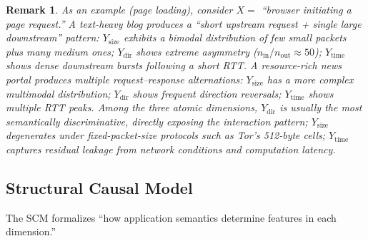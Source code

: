 \documentclass[lettersize,journal]{IEEEtran}
\newtheorem{remark}{Remark}
\begin{document}
\begin{remark}
As an example (page loading), consider $X=$ ``browser initiating a page
request.''
A text-heavy blog produces a ``short upstream request + single large
downstream'' pattern: $Y_{\mathrm{size}}$ exhibits a bimodal distribution
of few small packets plus many medium ones; $Y_{\mathrm{dir}}$ shows
extreme asymmetry ($n_{\mathrm{in}}/n_{\mathrm{out}}\approx 50$);
$Y_{\mathrm{time}}$ shows dense downstream bursts following a short RTT.
A resource-rich news portal produces multiple request--response alternations:
$Y_{\mathrm{size}}$ has a more complex multimodal distribution;
$Y_{\mathrm{dir}}$ shows frequent direction reversals;
$Y_{\mathrm{time}}$ shows multiple RTT peaks.
Among the three atomic dimensions, $Y_{\mathrm{dir}}$ is usually the most
semantically discriminative, directly exposing the interaction pattern;
$Y_{\mathrm{size}}$ degenerates under fixed-packet-size protocols such as
Tor's 512-byte cells; $Y_{\mathrm{time}}$ captures residual leakage from
network conditions and computation latency.
\end{remark}

\subsection{Structural Causal Model}

The SCM formalizes ``how application semantics determine features in each
dimension.''
\end{document}
